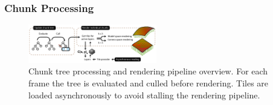 \documentclass[journal]{vgtc}                %
\newcommand{\kallecomment}[1]{\textbf{[-Kalle-~}
    \textcolor{orange}{#1}
    \textbf{~]}}
\newcommand{\emilcomment}[1]{\textbf{[-Emil-~}
    \textcolor{red}{#1}
    \textbf{~]}}
\newcommand{\plgrem}[1]{\textcolor{blue}{~\textbf{!!}~}}
\begin{document}
% 
% 
% 
% 
% 
% 
% 

\subsubsection{Chunk Processing} \label{sec:chunktree}
\begin{figure}
  \centering
    \includegraphics[width=0.5\textwidth]{figures/rendering-pipeline.pdf}
  \caption{Chunk tree processing and rendering pipeline overview. For each frame the tree is evaluated and culled before rendering. Tiles are loaded asynchronously to avoid stalling the rendering pipeline.}  \vspace{-4mm}
  \label{fig:chunkproc}
\end{figure}
\end{document}
